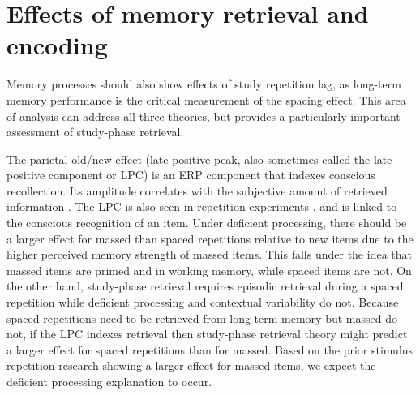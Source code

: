
\section{Effects of memory retrieval and encoding}

Memory processes should also show effects of study repetition lag, as long-term memory performance is the critical measurement of the spacing effect.  This area of analysis
can address all three theories, but provides a particularly important assessment of study-phase retrieval.



The parietal old/new effect (late positive peak, also sometimes called the late positive component or LPC) is an ERP component that indexes conscious recollection.  Its amplitude correlates with the subjective amount of retrieved information \cite{VilbEtal2006,Wild2000,WildRugg1996}.
The LPC is also seen in repetition experiments \cite{OlicEtal2000,VanSEtal2007}, and is linked to the conscious recognition of an item.
Under deficient processing,
there should be a larger effect for massed than spaced repetitions relative to new items due to the higher perceived memory strength of massed items.  This falls under the idea that massed items are primed and in working memory, while spaced items are not.
On the other hand, study-phase retrieval requires episodic retrieval during a spaced repetition while deficient processing and contextual variability do not.  \cbstart  Because spaced repetitions need to be retrieved from long-term memory but massed do not, if the LPC indexes retrieval then study-phase retrieval theory might predict a larger effect for spaced repetitions than for massed.  Based on the prior stimulus repetition research showing a larger effect for massed items, we expect the deficient processing explanation to occur.
\cbend

